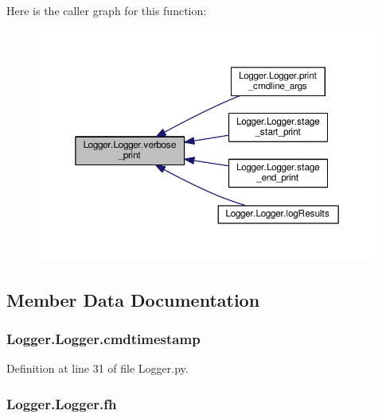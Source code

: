 Here is the caller graph for this function\-:
\nopagebreak
\begin{figure}[H]
\begin{center}
\leavevmode
\includegraphics[width=350pt]{class_logger_1_1_logger_a8c05e25fb36679fae21ab8910eb6d117_icgraph}
\end{center}
\end{figure}




\subsection{Member Data Documentation}
\hypertarget{class_logger_1_1_logger_a6424ebff90f965d7c6e4e8d7303bc3e2}{
\subsubsection[{cmdtimestamp}]{\setlength{\rightskip}{0pt plus 5cm}Logger.\-Logger.\-cmdtimestamp}}\label{class_logger_1_1_logger_a6424ebff90f965d7c6e4e8d7303bc3e2}


Definition at line 31 of file Logger.\-py.

\hypertarget{class_logger_1_1_logger_a68875fbff44820c122a69fee38bad238}{
\subsubsection[{fh}]{\setlength{\rightskip}{0pt plus 5cm}Logger.\-Logger.\-fh}}\label{class_logger_1_1_logger_a68875fbff44820c122a69fee38bad238}


